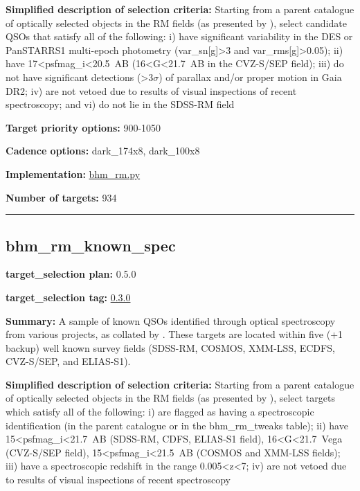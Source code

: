 \noindent\textbf{Simplified description of selection criteria:} Starting from a
parent catalogue of optically selected objects in the RM fields (as
presented by
\citealt{Yang2022}), select candidate QSOs that satisfy all of the
following: i) have significant variability in the DES or PanSTARRS1
multi-epoch photometry (var\_sn{[}g{]}\textgreater3 and
var\_rms{[}g{]}\textgreater0.05); ii) have
17\textless psfmag\_i\textless20.5~AB (16\textless G\textless21.7~AB in
the CVZ-S/SEP field); iii) do not have significant detections
(\textgreater3$\sigma$) of parallax and/or proper motion in Gaia DR2; iv) are
not vetoed due to results of visual inspections of recent spectroscopy;
and vi) do not lie in the SDSS-RM field


\noindent\textbf{Target priority options:} 900-1050

\noindent\textbf{Cadence options:} dark\_174x8, dark\_100x8

\noindent\textbf{Implementation:}
\href{https://github.com/sdss/target_selection/blob/0.3.0/python/target_selection/cartons/bhm_rm.py}{bhm\_rm.py}

\noindent\textbf{Number of targets:} 934

\begin{center}\rule{0.5\linewidth}{0.5pt}\end{center}

\hypertarget{bhm_rm_known_spec_plan0.5.0}{%
\subsection{bhm\_rm\_known\_spec}\label{bhm_rm_known_spec_plan0.5.0}}

\noindent\textbf{target\_selection plan:} 0.5.0

\noindent\textbf{target\_selection tag:}
\href{https://github.com/sdss/target_selection/tree/0.3.0/}{0.3.0}

\noindent\textbf{Summary:} A sample of known QSOs identified through optical
spectroscopy from various projects, as collated by
\citet{Yang2022}. These targets are located within five (+1 backup) well
known survey fields (SDSS-RM, COSMOS, XMM-LSS, ECDFS, CVZ-S/SEP, and
ELIAS-S1).

\noindent\textbf{Simplified description of selection criteria:} Starting from a
parent catalogue of optically selected objects in the RM fields (as
presented by
\citealt{Yang2022}), select targets which satisfy all of the following: i)
are flagged as having a spectroscopic identification (in the parent
catalogue or in the bhm\_rm\_tweaks table); ii) have
15\textless psfmag\_i\textless21.7~AB (SDSS-RM, CDFS, ELIAS-S1 field),
16\textless G\textless21.7~Vega (CVZ-S/SEP field),
15\textless psfmag\_i\textless21.5~AB (COSMOS and XMM-LSS fields); iii)
have a spectroscopic redshift in the range 0.005\textless z\textless7;
iv) are not vetoed due to results of visual inspections of recent
spectroscopy


